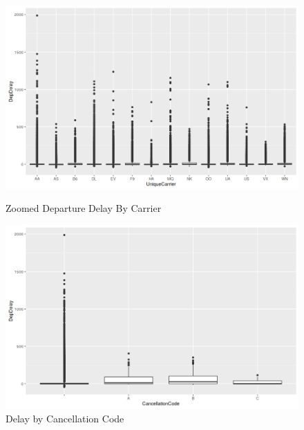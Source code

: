 \documentclass{article}
\begin{document}
    \begin{figure}[H]
      \includegraphics[width=\linewidth]{r_plots/box_delay_by_carrier.png}
      \caption{Zoomed Departure Delay By Carrier}
      \label{fig:graph1}
      \includegraphics[width=\linewidth]{r_plots/box_dep_delay_by_code.png}
      \caption{Delay by Cancellation Code}
      \label{fig:graph1}
    \end{figure}


    \newpage
\end{document}
